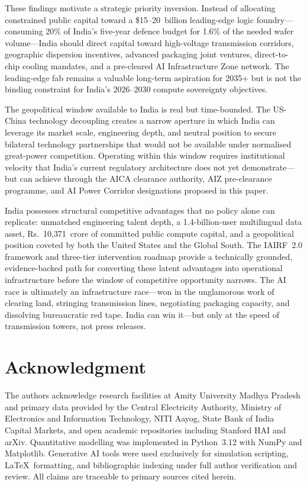\documentclass[conference]{IEEEtran}
\begin{document}
These findings motivate a strategic priority inversion. Instead of allocating constrained public capital toward a \$15--20~billion leading-edge logic foundry---consuming 20\% of India's five-year defence budget for 1.6\% of the needed wafer volume---India should direct capital toward high-voltage transmission corridors, geographic dispersion incentives, advanced packaging joint ventures, direct-to-chip cooling mandates, and a pre-cleared AI Infrastructure Zone network. The leading-edge fab remains a valuable long-term aspiration for 2035+ but is not the binding constraint for India's 2026--2030 compute sovereignty objectives.

The geopolitical window available to India is real but time-bounded. The US-China technology decoupling creates a narrow aperture in which India can leverage its market scale, engineering depth, and neutral position to secure bilateral technology partnerships that would not be available under normalised great-power competition. Operating within this window requires institutional velocity that India's current regulatory architecture does not yet demonstrate---but can achieve through the AICA clearance authority, AIZ pre-clearance programme, and AI Power Corridor designations proposed in this paper.

India possesses structural competitive advantages that no policy alone can replicate: unmatched engineering talent depth, a 1.4-billion-user multilingual data asset, Rs.~10{,}371~crore of committed public compute capital, and a geopolitical position coveted by both the United States and the Global South. The IAIRF~2.0 framework and three-tier intervention roadmap provide a technically grounded, evidence-backed path for converting these latent advantages into operational infrastructure before the window of competitive opportunity narrows. The AI race is ultimately an infrastructure race---won in the unglamorous work of clearing land, stringing transmission lines, negotiating packaging capacity, and dissolving bureaucratic red tape. India can win it---but only at the speed of transmission towers, not press releases.

\section*{Acknowledgment}
The authors acknowledge research facilities at Amity University Madhya Pradesh and primary data provided by the Central Electricity Authority, Ministry of Electronics and Information Technology, NITI Aayog, State Bank of India Capital Markets, and open academic repositories including Stanford HAI and arXiv. Quantitative modelling was implemented in Python~3.12 with NumPy and Matplotlib. Generative AI tools were used exclusively for simulation scripting, \LaTeX\ formatting, and bibliographic indexing under full author verification and review. All claims are traceable to primary sources cited herein.

\balance



\end{document}
